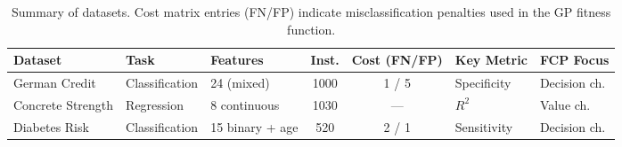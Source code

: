 \begin{table}[ht]
  \centering
  \small
  \caption{Summary of datasets. Cost matrix entries (FN/FP) indicate misclassification penalties used in the GP fitness function.}
  \label{tab:datasets}
  \begin{tabular}{@{}lllccll@{}}
    \toprule
    \textbf{Dataset} & \textbf{Task} & \textbf{Features} & \textbf{Inst.} & \textbf{Cost (FN/FP)} & \textbf{Key Metric} & \textbf{FCP Focus} \\
    \midrule
    German Credit & Classification & 24 (mixed) & 1000 & 1 / 5 & Specificity & Decision ch. \\
    Concrete Strength & Regression & 8 continuous & 1030 & --- & $R^2$ & Value ch. \\
    Diabetes Risk & Classification & 15 binary + age & 520 & 2 / 1 & Sensitivity & Decision ch. \\
    \bottomrule
  \end{tabular}
\end{table}